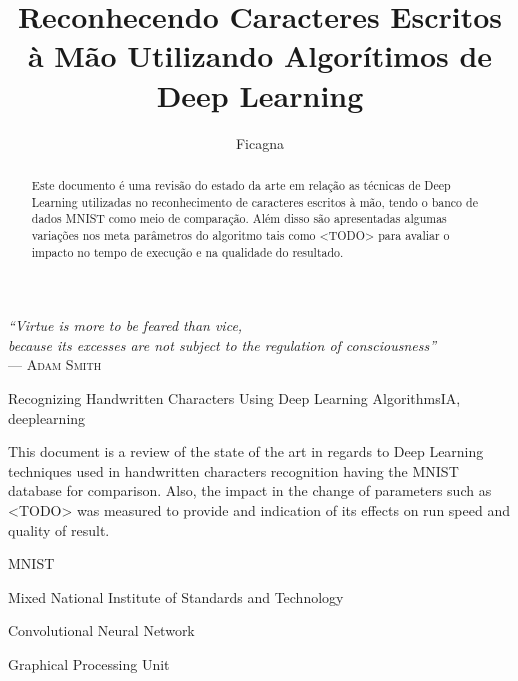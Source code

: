 \documentclass[cic,tc]{iiufrgs}
\title{Reconhecendo Caracteres Escritos à Mão Utilizando Algorítimos de Deep Learning}
\author{Ficagna}{Alan}
\date{}{2015}
\begin{document}
\maketitle

\clearpage
\begin{flushright}
  \mbox{}\vfill
  {\sffamily\itshape{}
    ``Virtue is more to be feared than vice,\\
    because its excesses are not subject to the regulation of consciousness''\\}
  --- \textsc{Adam Smith}
\end{flushright}

\begin{abstract}

  Este documento é uma revisão do estado da arte em relação as técnicas de
Deep Learning utilizadas no reconhecimento de caracteres escritos à mão, tendo o
banco de dados MNIST como meio de comparação. Além disso são apresentadas
algumas variações nos meta parâmetros do algoritmo tais como <TODO> para
avaliar o impacto no tempo de execução e na qualidade do resultado.
\end{abstract}

\begin{englishabstract}{Recognizing Handwritten Characters Using Deep Learning Algorithms}{IA, deeplearning} %

  This document is a review of the state of the art in regards to Deep Learning
techniques used in handwritten characters recognition having the MNIST
database for comparison. Also, the impact in the change of parameters such as
<TODO> was measured to provide and indication of its effects on run speed and
quality of result.

\end{englishabstract}

\listoffigures
\listoftables
\begin{listofabbrv}{MNIST} %
 \item[MNIST] Mixed National Institute of Standards and Technology
 \item[CNN] Convolutional Neural Network
 \item[GPU] Graphical Processing Unit
\end{listofabbrv}
\tableofcontents

\end{document}
